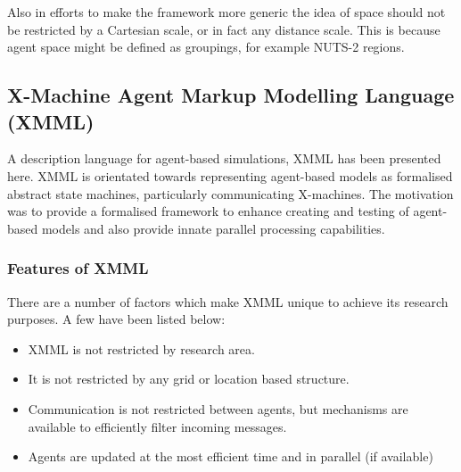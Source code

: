 \documentclass[a4paper,11pt]{article}
\begin{document}
Also in efforts to make the framework more generic the idea of space should not be restricted by a Cartesian scale, or in fact any distance scale. This is because agent space might be defined as groupings, for example NUTS-2 regions.





\subsection{X-Machine Agent Markup Modelling Language (XMML)}

A description language for agent-based simulations, XMML has been
presented here. XMML is orientated towards representing agent-based
models as formalised abstract state machines, particularly
communicating X-machines. The motivation was to provide a formalised
framework to enhance creating and testing of agent-based models and
also provide innate parallel processing capabilities.

\subsubsection{Features of XMML}

There are a number of factors which make XMML unique to achieve its
research purposes. A few have been listed below:
\begin{itemize}
\item XMML is not restricted by research area.
\item It is not restricted by any grid or location based structure.
\item Communication is not restricted between agents, but mechanisms are available to efficiently filter incoming messages.
\item Agents are updated at the most efficient time and in parallel (if available)
\end{itemize}
\end{document}
